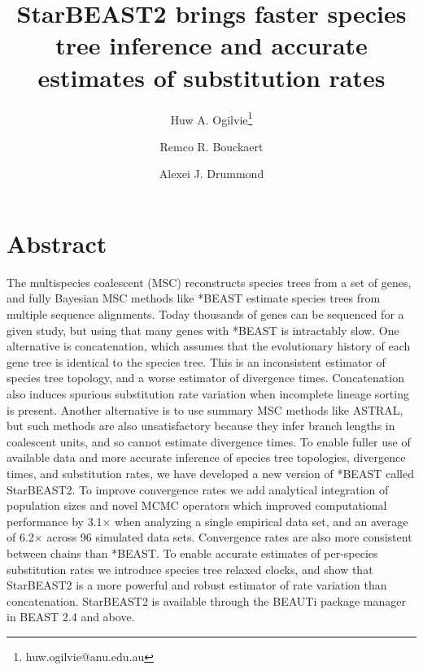 \documentclass[12pt]{article}
\begin{document}
\title{StarBEAST2 brings faster species tree inference and accurate estimates of substitution rates}
\author[1,2]{Huw A. Ogilvie\thanks{huw.ogilvie@anu.edu.au}}
\author[2,3]{Remco R. Bouckaert}
\author[2,3]{Alexei J. Drummond}

\maketitle

\clearpage

\justifying

\section*{Abstract}

The multispecies coalescent (MSC) reconstructs species trees from a set of
genes, and fully Bayesian MSC methods like *BEAST estimate species trees from
multiple sequence alignments. Today thousands of genes can be sequenced for a
given study, but using that many genes with *BEAST is intractably slow. One
alternative is concatenation, which assumes that the evolutionary history of
each gene tree is identical to the species tree. This is an inconsistent
estimator of species tree topology, and a worse estimator of divergence times.
Concatenation also induces spurious substitution rate variation when incomplete
lineage sorting is present. Another alternative is to use summary MSC methods
like ASTRAL, but such methods are also unsatisfactory because they infer branch
lengths in coalescent units, and so cannot estimate divergence times. To enable
fuller use of available data and more accurate inference of species tree
topologies, divergence times, and substitution rates, we have developed a new
version of *BEAST called StarBEAST2. To improve convergence rates we add
analytical integration of population sizes and novel MCMC operators which
improved computational performance by 3.1$\times$ when analyzing a single
empirical data set, and an average of 6.2$\times$ across 96 simulated data sets.
Convergence rates are also more consistent between chains than *BEAST. To enable
accurate estimates of per-species substitution rates we introduce species tree
relaxed clocks, and show that StarBEAST2 is a more powerful and robust estimator
of rate variation than concatenation. StarBEAST2 is available through the BEAUTi
package manager in BEAST 2.4 and above.
\end{document}
